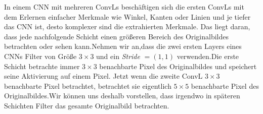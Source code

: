 \documentclass[12pt,a4paper]{scrartcl}
\numberwithin{equation}{section}
\begin{document}
In einem \ac{CNN} mit mehreren \acsp{ConvL} beschäftigen sich die ersten \acsp{ConvL} mit dem Erlernen einfacher Merkmale wie Winkel, Kanten oder Linien und je tiefer das \ac{CNN} ist, desto komplexer sind die extrahierten Merkmale. Das liegt daran, dass jede nachfolgende Schicht einen größeren Bereich des Originalbildes betrachten oder \glqq sehen \grqq{} kann.Nehmen wir an,dass die zwei ersten Layers eines \acsp{CNN} Filter von Größe $ 3\times 3 $  und ein \textit{Stride} $ =(1,1) $ verwenden.Die erste Schicht betrachte immer $ 3\times3 $ benachbarte Pixel des Originalbildes und speichert seine Aktivierung auf einem Pixel. Jetzt wenn die zweite \ac{ConvL}  $ 3\times3 $ benachbarte Pixel betrachtet, betrachtet sie eigentlich  $ 5\times5 $ benachbarte Pixel des Originalbildes.Wir können uns deshalb vorstellen, dass irgendwo in späteren Schichten Filter das gesamte Originalbild betrachten.
% 
\end{document}
